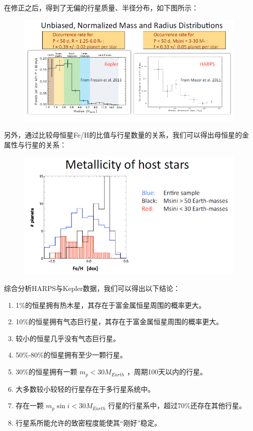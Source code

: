 \documentclass[letterpaper,10pt,english]{sphinxmanual}
\begin{document}
在修正之后，得到了无偏的行星质量、半径分布，如下图所示：
\begin{figure}[htbp]
\centering

\includegraphics{Unbiased_distribution.jpg}
\end{figure}

另外，通过比较母恒星Fe/H的比值与行星数量的关系，我们可以得出母恒星的金属性与行星的关系：
\begin{figure}[htbp]
\centering

\includegraphics{Metallicity.jpg}
\end{figure}

综合分析HARPS与Kepler数据，我们可以得出以下结论：
\begin{enumerate}
\item {} 
1\%的恒星拥有热木星，其存在于富金属恒星周围的概率更大。

\item {} 
10\%的恒星拥有气态巨行星，其存在于富金属恒星周围的概率更大。

\item {} 
较小的恒星几乎没有气态巨行星。

\item {} 
50\%-80\%的恒星拥有至少一颗行星。

\item {} 
30\%的恒星拥有一颗 \(m_p < 30M_{Earth}\) ，周期100天以内的行星。

\item {} 
大多数较小较轻的行星存在于多行星系统中。

\item {} 
存在一颗 \(m_p \sin i < 30M_{Earth}\) 行星的行星系中，超过70\%还存在其他行星。

\item {} 
行星系所能允许的致密程度能使其“刚好”稳定。

\end{enumerate}
\end{document}
